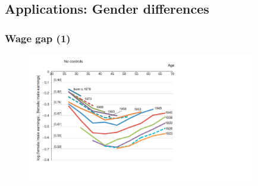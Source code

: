 \documentclass{beamer}
\newcommand{\1}{\mathbb{1}}
\begin{document}
%

%

\subsection{Applications: Gender differences}


\begin{frame}\frametitle{Wage gap (1)}
\begin{figure}
\includegraphics[width = 10cm]{plot/gendergap}
\end{figure}
\end{frame}
\end{document}
